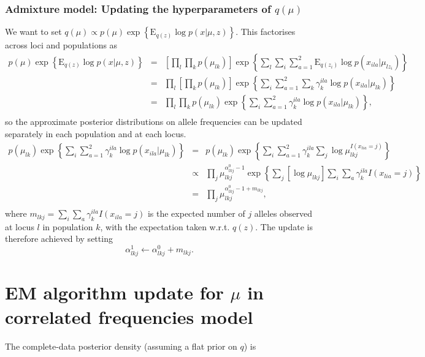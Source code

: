 \documentclass[12pt,a4paper,reqno]{article}
\newcommand{\E}{\text{E}{}}
\newcommand{\(}{\left(}
\newcommand{\)}{\right)}
\newcommand{\|}{\arrowvert}
\begin{document}
\subsubsection{Admixture model: Updating the hyperparameters of $q(\mu)$} \label{q(mu)-update-admixture}
We want to set $q(\mu) \propto p(\mu)\exp\left\{\E_{q(z)} \log p(x|\mu,z)\right\}$. This factorises across loci and populations as
\begin{eqnarray*}
  p(\mu)\exp\left\{\E_{q(z)} \log p(x|\mu,z)\right\} 
&=& \left[\prod_{l}\prod_{k}p(\mu_{lk})\right]\exp\left\{\sum_{l} \sum_{i} \sum_{a=1}^{2}\E_{q(z_{i})} \log p(x_{ila}|\mu_{lz_{i}})\right\} \\
&=& \prod_{l}\left[\prod_{k}p(\mu_{lk})\right]\exp\left\{\sum_{i} \sum_{a=1}^{2}\sum_{k} \gamma^{ila}_{k}\log p(x_{ila}|\mu_{lk})\right\} \\
&=& \prod_{l}\prod_{k}p(\mu_{lk})\exp\left\{\sum_{i} \sum_{a=1}^{2} \gamma^{ila}_{k}\log p(x_{ila}|\mu_{lk})\right\}, \\
\end{eqnarray*}
so the approximate posterior distributions on allele frequencies can be updated separately in each population and at each locus.
\begin{eqnarray*}
p(\mu_{lk})\exp\left\{\sum_{i} \sum_{a=1}^{2} \gamma^{ila}_{k}\log p(x_{ila}|\mu_{lk})\right\}
&=& p(\mu_{lk})\exp\left\{\sum_{i} \sum_{a=1}^{2} \gamma^{ila}_{k} \sum_{j} \log \mu_{lkj}^{I(x_{lia}=j)}\right\} \\
&\propto& \prod_{j}\mu_{lkj}^{\alpha^{0}_{lkj}-1}\exp\left\{\sum_{j} \left[\log \mu_{lkj}\right] \sum_{i} \sum_{a}\gamma^{ila}_{k}I(x_{lia}=j)\right\}\\
&=& \prod_{j}\mu_{lkj}^{\alpha^{0}_{lkj}-1+m_{lkj}},\\
\end{eqnarray*}
where $m_{lkj} = \sum_{i} \sum_{a}\gamma^{ila}_{k}I(x_{ila}=j)$ is the expected number of $j$ alleles observed at locus $l$ in population $k$, with the expectation taken w.r.t. $q(z)$. The update is therefore achieved by setting
\begin{equation*}
  \alpha^{1}_{lkj} \leftarrow \alpha^{0}_{lkj} + m_{lkj}.
\end{equation*}

\newpage
\section{EM algorithm update for $\mu$ in correlated frequencies model}

\paragraph{}
The complete-data posterior density (assuming a flat prior on $q$) is
\end{document}
